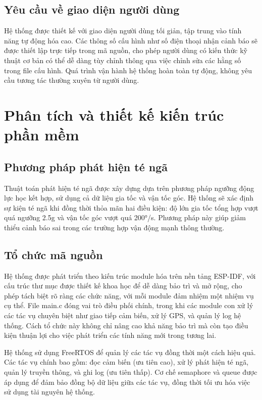 \documentclass[a4paper,12pt]{report}
\begin{document}
	\subsection{Yêu cầu về giao diện người dùng}
	
	Hệ thống được thiết kế với giao diện người dùng tối giản, tập trung vào tính năng tự động hóa cao. Các thông số cấu hình như số điện thoại nhận cảnh báo sẽ được thiết lập trực tiếp trong mã nguồn, cho phép người dùng có kiến thức kỹ thuật cơ bản có thể dễ dàng tùy chỉnh thông qua việc chỉnh sửa các hằng số trong file cấu hình. Quá trình vận hành hệ thống hoàn toàn tự động, không yêu cầu tương tác thường xuyên từ người dùng.
	
	\section{Phân tích và thiết kế kiến trúc phần mềm}
	
	\subsection{Phương pháp phát hiện té ngã}
	
	Thuật toán phát hiện té ngã được xây dựng dựa trên phương pháp ngưỡng động lực học kết hợp, sử dụng cả dữ liệu gia tốc và vận tốc góc. Hệ thống sẽ xác định sự kiện té ngã khi đồng thời thỏa mãn hai điều kiện: độ lớn gia tốc tổng hợp vượt quá ngưỡng 2.5g và vận tốc góc vượt quá 200°/s. Phương pháp này giúp giảm thiểu cảnh báo sai trong các trường hợp vận động mạnh thông thường.
	
	\subsection{Tổ chức mã nguồn}
	
	Hệ thống được phát triển theo kiến trúc module hóa trên nền tảng ESP-IDF, với cấu trúc thư mục được thiết kế khoa học để dễ dàng bảo trì và mở rộng, cho phép tách biệt rõ ràng các chức năng, với mỗi module đảm nhiệm một nhiệm vụ cụ thể. File main.c đóng vai trò điều phối chính, trong khi các module con xử lý các tác vụ chuyên biệt như giao tiếp cảm biến, xử lý GPS, và quản lý log hệ thống. Cách tổ chức này không chỉ nâng cao khả năng bảo trì mà còn tạo điều kiện thuận lợi cho việc phát triển các tính năng mới trong tương lai.
	
	Hệ thống sử dụng FreeRTOS để quản lý các tác vụ đồng thời một cách hiệu quả. Các tác vụ chính bao gồm: đọc cảm biến (ưu tiên cao), xử lý phát hiện té ngã, quản lý truyền thông, và ghi log (ưu tiên thấp). Cơ chế semaphore và queue được áp dụng để đảm bảo đồng bộ dữ liệu giữa các tác vụ, đồng thời tối ưu hóa việc sử dụng tài nguyên hệ thống.
	
\end{document}
